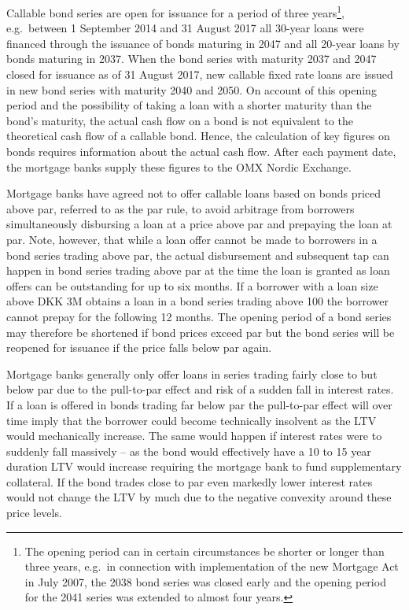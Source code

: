 \documentclass[12pt,twoside]{reedthesis}
\begin{document}
Callable bond series are open for issuance for a period of three years\footnote{The opening period can in certain circumstances be shorter or longer than three years, e.g.~in connection with implementation of the new Mortgage Act in July 2007, the 2038 bond series was closed early and the opening period for the 2041 series was extended to almost four years.}, e.g.~between 1 September 2014 and 31 August 2017 all 30-year loans were financed through the issuance of bonds maturing in 2047 and all 20-year loans by bonds maturing in 2037. When the bond series with maturity 2037 and 2047 closed for issuance as of 31 August 2017, new callable fixed rate loans are issued in new bond series with maturity 2040 and 2050. On account of this opening period and the possibility of taking a loan with a shorter maturity than the bond's maturity, the actual cash flow on a bond is not equivalent to the theoretical cash flow of a callable bond. Hence, the calculation of key figures on bonds requires information about the actual cash flow. After each payment date, the mortgage banks
supply these figures to the OMX Nordic Exchange.

Mortgage banks have agreed not to offer callable loans based on bonds priced above par, referred to as the par rule, to avoid arbitrage from borrowers simultaneously disbursing a loan at a price above par and prepaying the loan at par. Note, however, that while a loan offer cannot be made to borrowers in a bond series trading above par, the actual disbursement and subsequent tap can happen in bond series trading above par at the time the loan is granted as loan offers can be outstanding for up to six months. If a borrower with a loan size above DKK 3M obtains a loan in a bond series trading above 100 the borrower cannot prepay for the following 12 months. The opening period of a bond series may therefore be shortened if bond prices exceed par but the bond series will be reopened for issuance if the price falls below par again.

Mortgage banks generally only offer loans in series trading fairly close to but below par due to the pull-to-par effect and risk of a sudden fall in interest rates. If a loan is offered in bonds trading far below par the pull-to-par effect will over time imply that the borrower could become technically insolvent as the LTV would mechanically increase. The same would happen if interest rates were to suddenly fall massively -- as the bond would effectively have a 10 to 15 year duration LTV would increase requiring the mortgage bank to fund supplementary collateral. If the bond trades close to par even markedly lower interest rates would not change the LTV by much due to the negative convexity around these price levels.
\end{document}
